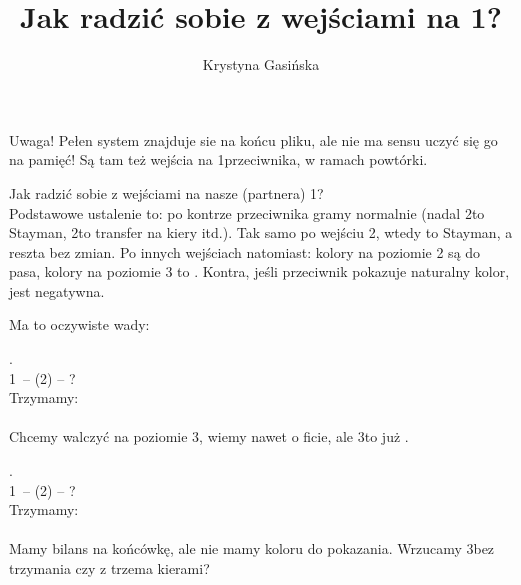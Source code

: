 \documentclass[12pt, a4paper]{article}
\title{Jak radzić sobie z wejściami na 1\nt?}
\author{Krystyna Gasińska}
\begin{document}
\maketitle

\begin{formal}
Uwaga! Pełen system znajduje sie na końcu pliku, ale nie ma sensu uczyć się go na pamięć!
Są tam też wejścia na 1\nt przeciwnika, w ramach powtórki.
\end{formal}




Jak radzić sobie z wejściami na nasze (partnera) 1\nt?\\
Podstawowe ustalenie to: po kontrze przeciwnika
gramy normalnie (nadal 2\clubs to Stayman, 
2\diams to transfer na kiery itd.). Tak samo po
wejściu 2\clubs, wtedy \dbl to Stayman, a reszta bez zmian.
Po innych wejściach natomiast: kolory na poziomie 2
są do pasa, kolory na poziomie 3 to \gf. Kontra, jeśli
przeciwnik pokazuje naturalny kolor, jest negatywna.

Ma to oczywiste wady:

\vspace{0.3cm}
.\\
1\nt\ -- (2\spades) -- ?\\
Trzymamy:\\
\\
Chcemy walczyć na poziomie 3, wiemy nawet o ficie, ale 3\hearts to już \gf.

\vspace{0.3cm}
.\\
1\nt\ -- (2\spades) -- ?\\
Trzymamy:\\
\\
Mamy bilans na końcówkę, ale nie mamy koloru do pokazania.
Wrzucamy 3\nt bez trzymania czy \dbl z trzema kierami?
\end{document}
